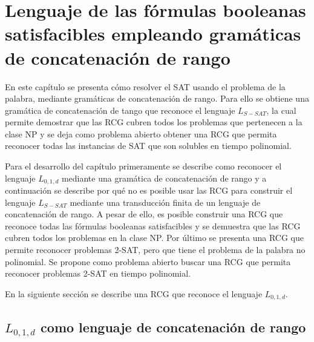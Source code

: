 


\chapter{Lenguaje de las fórmulas booleanas satisfacibles empleando gramáticas de concatenación de rango}
\label{chap:LSATRCG}

En este capítulo se presenta cómo resolver el SAT usando el problema de la palabra, mediante gramáticas de 
concatenación de rango. Para ello se obtiene una gramática de concatenación de tango que reconoce el lenguaje $L_{S-SAT}$, la cual permite demostrar que las RCG cubren todos los problemas que pertenecen a la clase NP y se deja como problema abierto obtener una RCG que permita reconocer todas las instancias de SAT que son solubles en tiempo polinomial.

Para el desarrollo del capítulo primeramente se describe como reconocer el lenguaje $L_{0,1,d}$ mediante una gramática de concatenación de rango y a continuación se describe por qué no es posible usar las RCG para construir el lenguaje $L_{S-SAT}$ mediante una transducción finita de un lenguaje de concatenación de rango. A pesar de ello, es posible construir una RCG que reconoce todas las fórmulas booleanas satisfacibles y se demuestra que las RCG cubren todos los problemas en la clase NP. Por último se presenta una RCG que permite reconocer problemas 2-SAT, pero que tiene el problema de la palabra no polinomial. Se propone como problema abierto buscar una RCG que permita reconocer problemas 2-SAT en tiempo polinomial.

En la siguiente sección se describe una RCG que reconoce el lenguaje $L_{0,1,d}$.

\section{$L_{0,1,d}$ como lenguaje de concatenación de rango}

